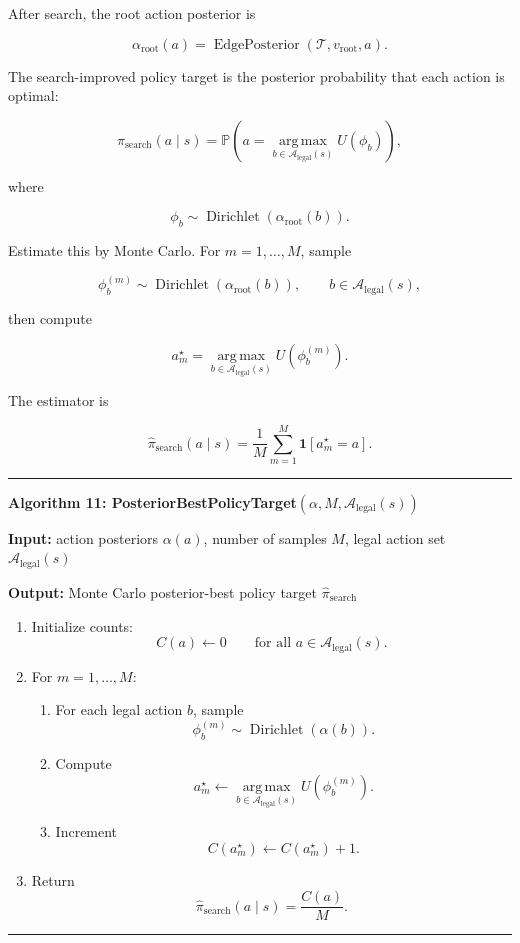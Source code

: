 \documentclass[11pt]{article}
\newcommand{\Prob}{\mathbb{P}}
\newcommand{\one}{\mathbf{1}}
\newcommand{\Dir}{\operatorname{Dirichlet}}
\newcommand{\argmax}{\operatorname*{arg\,max}}
\newcommand{\Tree}{\mathcal{T}}
\newcommand{\Legal}{\mathcal{A}_{\mathrm{legal}}}
\newcommand{\Utility}{U}
\newcommand{\EdgePosterior}{\operatorname{EdgePosterior}}
\newenvironment{algorithmblock}[1]
{
  \par\medskip
  \noindent\hrule\par\smallskip
  \noindent\textbf{#1}
  \par\smallskip
}
{
  \par\smallskip\noindent\hrule\par\medskip
}
\newcommand{\Input}{\textbf{Input: }}
\newcommand{\Output}{\textbf{Output: }}
\begin{document}
After search, the root action posterior is

\[
\alpha_{\mathrm{root}}(a)
=
\EdgePosterior(\Tree,v_{\mathrm{root}},a).
\]

The search-improved policy target is the posterior probability that each action
is optimal:

\[
\pi_{\mathrm{search}}(a\mid s)
=
\Prob
\left(
a
=
\argmax_{b\in\Legal(s)}
\Utility(\phi_b)
\right),
\]

where

\[
\phi_b
\sim
\Dir(\alpha_{\mathrm{root}}(b)).
\]

Estimate this by Monte Carlo. For \(m=1,\ldots,M\), sample

\[
\phi_b^{(m)}
\sim
\Dir(\alpha_{\mathrm{root}}(b)),
\qquad
b\in\Legal(s),
\]

then compute

\[
a_m^\star
=
\argmax_{b\in\Legal(s)}
\Utility(\phi_b^{(m)}).
\]

The estimator is

\[
\hat{\pi}_{\mathrm{search}}(a\mid s)
=
\frac{1}{M}
\sum_{m=1}^{M}
\one[a_m^\star=a].
\]

\begin{algorithmblock}{Algorithm 11: PosteriorBestPolicyTarget\((\alpha,M,\Legal(s))\)}

\Input action posteriors \(\alpha(a)\), number of samples \(M\), legal action set \(\Legal(s)\)

\Output Monte Carlo posterior-best policy target \(\hat{\pi}_{\mathrm{search}}\)

\begin{enumerate}[leftmargin=2em]
  \item Initialize counts:
  \[
  C(a)\gets 0
  \qquad
  \text{for all } a\in\Legal(s).
  \]

  \item For \(m=1,\ldots,M\):

  \begin{enumerate}[leftmargin=2em]
    \item For each legal action \(b\), sample
    \[
    \phi_b^{(m)}
    \sim
    \Dir(\alpha(b)).
    \]

    \item Compute
    \[
    a_m^\star
    \gets
    \argmax_{b\in\Legal(s)}
    \Utility(\phi_b^{(m)}).
    \]

    \item Increment
    \[
    C(a_m^\star)
    \gets
    C(a_m^\star)+1.
    \]
  \end{enumerate}

  \item Return
  \[
  \hat{\pi}_{\mathrm{search}}(a\mid s)
  =
  \frac{C(a)}{M}.
  \]
\end{enumerate}

\end{algorithmblock}
\end{document}
